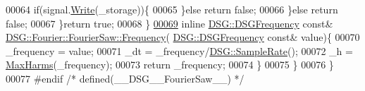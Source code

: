 \begin{DoxyCode}
00064                     \textcolor{keywordflow}{if}(signal.\hyperlink{class_d_s_g_1_1_ring_buffer_aa5dd2caa0a270173251faee40a43d692}{Write}(\_storage))\{
00065                     \}\textcolor{keywordflow}{else} \textcolor{keywordflow}{return} \textcolor{keyword}{false};
00066                 \}\textcolor{keywordflow}{else} \textcolor{keywordflow}{return} \textcolor{keyword}{false};
00067             \}\textcolor{keywordflow}{return} \textcolor{keyword}{true};
00068         \}
\hypertarget{_fourier_saw_8h_source_l00069}{}\hyperlink{class_d_s_g_1_1_fourier_1_1_fourier_saw_afa3d86f404be3665f10c74fe9286ef10}{00069}         \textcolor{keyword}{inline} \hyperlink{namespace_d_s_g_a4315a061386fa1014fda09b15d3a6973}{DSG::DSGFrequency} \textcolor{keyword}{const}& 
      \hyperlink{class_d_s_g_1_1_phasor_a6bdec1d2722e2fa5c7173ac5f7adf682}{DSG::Fourier::FourierSaw::Frequency}(
      \hyperlink{namespace_d_s_g_a4315a061386fa1014fda09b15d3a6973}{DSG::DSGFrequency} \textcolor{keyword}{const}& value)\{
00070             \_frequency = value;
00071             \_dt = \_frequency/\hyperlink{namespace_d_s_g_a72df05177db0412c3590070923f62819}{DSG::SampleRate}();
00072             \_h = \hyperlink{namespace_d_s_g_ab5c4eea42ea10b69cfc32afb83ff1d0d}{MaxHarms}(\_frequency);
00073             \textcolor{keywordflow}{return} \_frequency;
00074         \}
00075     \}
00076 \}
00077 \textcolor{preprocessor}{#endif }\textcolor{comment}{/* defined(\_\_DSG\_\_FourierSaw\_\_) */}\textcolor{preprocessor}{}
\end{DoxyCode}
